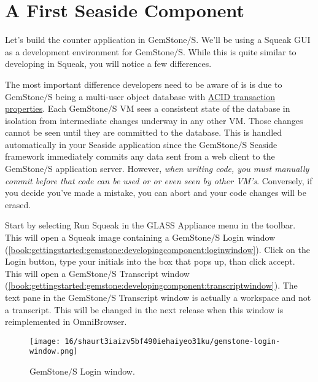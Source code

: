 \documentclass[a4paper,10pt,twoside]{book}
\begin{document}
\section{A First Seaside Component}
\label{book:gettingstarted:gemstone:developingcomponent}

Let's build the counter application in GemStone$/$S. We'll be using a Squeak GUI as a development environment for GemStone$/$S. While this is quite similar to developing in Squeak, you will notice a few differences. 

The most important difference developers need to be aware of is is due to GemStone$/$S being a multi-user object database with \href{http://en.wikipedia.org/wiki/ACID}{ACID transaction properties}. Each GemStone$/$S VM sees a consistent state of the database in isolation from intermediate changes underway in any other VM. Those changes cannot be seen until they are committed to the database. This is handled automatically in your Seaside application since the GemStone$/$S Seaside framework immediately commits any data sent from a web client to the GemStone$/$S application server. However, \textit{when writing code, you must manually commit before that code can be used or or even seen by other VM's}. Conversely, if you decide you've made a mistake, you can abort and your code changes will be erased. 

Start by selecting Run Squeak in the GLASS Appliance menu in the toolbar. This will open a Squeak image containing a GemStone$/$S Login window (\autoref{book:gettingstarted:gemstone:developingcomponent:loginwindow}). Click on the Login button, type your initials into the box that pops up, than click accept. This will open a GemStone$/$S Transcript window (\autoref{book:gettingstarted:gemstone:developingcomponent:transcriptwindow}). The text pane in the GemStone$/$S Transcript window is actually a workspace and not a transcript. This will be changed in the next release when this window is reimplemented in OmniBrowser.

\begin{figure}[h!tbp]
	\begin{center}
		\texttt{[image: 16/shaurt3iaizv5bf490iehaiyeo31ku/gemstone-login-window.png]}
		\caption{GemStone$/$S Login window.\label{book:gettingstarted:gemstone:developingcomponent:loginwindow}}
	\end{center}
\end{figure}
\end{document}
